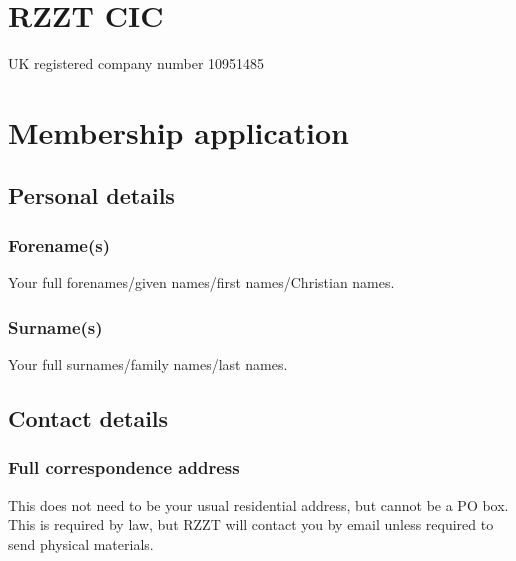 \documentclass[a4paper,10pt]{article}
\begin{document}
\thispagestyle{firstpage}

\begin{Form}

\raggedright

\section{RZZT CIC}

UK registered company number 10951485

\section{Membership application}

\subsection{Personal details}

\subsubsection{Forename(s)}

Your full forenames/given names/first names/Christian names.

\begin{framed}%
  \TextField[width=\textwidth,maxlen=75,donotscroll=true,name=forename]{ }%
\end{framed}%

\subsubsection{Surname(s)}

Your full surnames/family names/last names.

\begin{framed}%
  \TextField[width=\textwidth,donotscroll=true,name=surname]{ }%
\end{framed}%

\subsection{Contact details}

\subsubsection{Full correspondence address}

This does not need to be your usual residential address, but cannot be a PO box. This is required by law, but RZZT will contact you by email unless required to send physical materials.


\end{Form}
\end{document}
